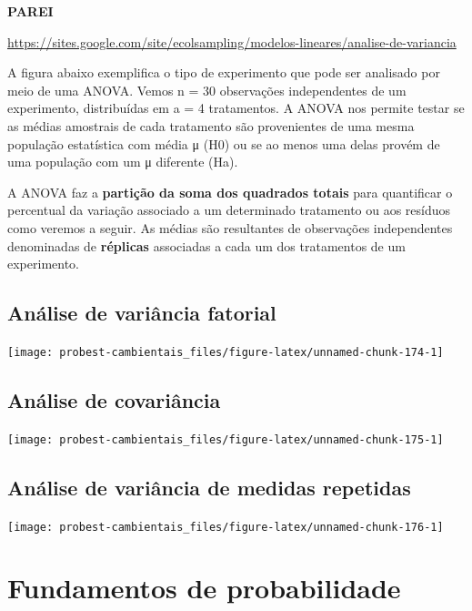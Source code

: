 \documentclass[
]{book}
\begin{document}
\textbf{PAREI}

\url{https://sites.google.com/site/ecolsampling/modelos-lineares/analise-de-variancia}

A figura abaixo exemplifica o tipo de experimento que pode ser analisado por meio de uma ANOVA. Vemos n = 30 observações independentes de um experimento, distribuídas em a = 4 tratamentos. A ANOVA nos permite testar se as médias amostrais de cada tratamento são provenientes de uma mesma população estatística com média μ (H0) ou se ao menos uma delas provém de uma população com um μ diferente (Ha).

A ANOVA faz a \textbf{partição da soma dos quadrados totais} para quantificar o percentual da variação associado a um determinado tratamento ou aos resíduos como veremos a seguir. As médias são resultantes de observações independentes denominadas de \textbf{réplicas} associadas a cada um dos tratamentos de um experimento.

\hypertarget{anovafatorial}{%
\chapter{Análise de variância fatorial}\label{anovafatorial}}

\begin{center}\texttt{[image: probest-cambientais\_files/figure-latex/unnamed-chunk-174-1]} \end{center}

\hypertarget{ancova}{%
\chapter{Análise de covariância}\label{ancova}}

\begin{center}\texttt{[image: probest-cambientais\_files/figure-latex/unnamed-chunk-175-1]} \end{center}

\hypertarget{repanova}{%
\chapter{Análise de variância de medidas repetidas}\label{repanova}}

\begin{center}\texttt{[image: probest-cambientais\_files/figure-latex/unnamed-chunk-176-1]} \end{center}

\hypertarget{part-fundamentos-de-probabilidade}{%
\part{Fundamentos de probabilidade}\label{part-fundamentos-de-probabilidade}}
\end{document}
